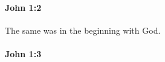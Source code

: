 		\paragraph{John 1:2} %
			\label{JOHN-1-2}

			The same was in the beginning with God.

			\begin{framed}
			\scriptsize
				\begin{compactdesc}
					\item[SBLG] 
				\end{compactdesc}
			\end{framed}

		\paragraph{John 1:3} %
			\label{JOHN-1-3}

